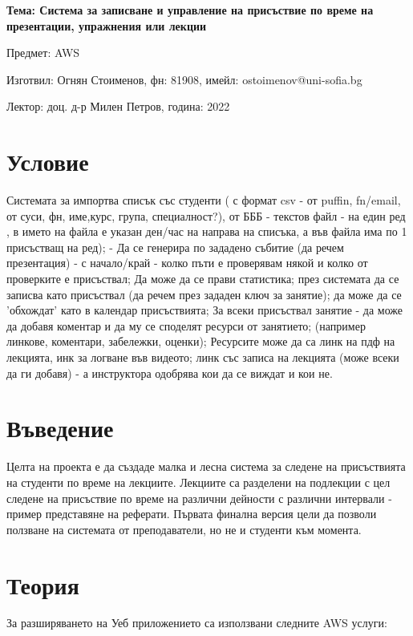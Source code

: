 \documentclass[12pt]{article}
\begin{document}
	\begin{center}
        \LARGE{\textbf{Тема: Система за записване и управление на присъствие по време на презентации, упражнения или лекции}}
        
        \bigskip
        \Large{Предмет: AWS}
        
        \medskip
        \Large{Изготвил: Огнян Стоименов, фн: 81908, имейл: ostoimenov@uni-sofia.bg}
        
        \medskip
        \Large{Лектор: доц. д-р Милен Петров, година: 2022}
        
        \bigskip
	\end{center}
    
    
    \tableofcontents
    \bigskip
    \bigskip
    \newpage
  
\section{Условие} 
Системата за импортва списък със студенти ( с формат csv - от puffin, fn/email, от суси, фн, име,курс, група, специалност?), от БББ - текстов файл - на един ред , в името на файла е указан ден/час на направа на списъка, а във файла има по 1 присъстващ на ред); - Да се генерира по зададено събитие (да речем презентация) - с начало/край - колко пъти е проверявам някой и колко от проверките е присъствал; Да може да се прави статистика; през системата да се записва като присъствал (да речем през зададен ключ за занятие); да може да се 'обхождат' като в календар присъствията; За всеки присъствал занятие - да може да добавя коментар и да му се споделят ресурси от занятието; (например линкове, коментари, забележки, оценки); Ресурсите може да са линк на пдф на лекцията, инк за логване във видеото; линк със записа на лекцията (може всеки да ги добавя) - а инструктора одобрява кои да се виждат и кои не.

\section{Въведение}
Целта на проекта е да създаде малка и лесна система за следене на присъствията на студенти по време на лекциите. Лекциите са разделени на подлекции с цел следене на присъствие по време на различни дейности с различни интервали - пример представяне на реферати. Първата финална версия цели да позволи ползване на системата от преподаватели, но не и студенти към момента. 
\section{Теория}
\noindent За разширяването на Уеб приложението са използвани следните AWS услуги:  
\medskip
\end{document}
